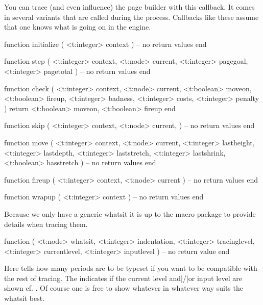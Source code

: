 You can trace (and even influence) the page builder with this callback. It comes in
several variants that are called during the process. Callbacks like these assume that
one knows what is going on in the engine.

\starttyping[option=LUA]
function initialize (
    <t:integer> context
)
    -- no return values
end
\stoptyping

\starttyping[option=LUA]
function step (
    <t:integer> context,
    <t:node>    current,
    <t:integer> pagegoal,
    <t:integer> pagetotal
)
    -- no return values
end
\stoptyping

\starttyping[option=LUA]
function check (
    <t:integer> context,
    <t:node>    current,
    <t:boolean> moveon,
    <t:boolean> fireup,
    <t:integer> badness,
    <t:integer> costs,
    <t:integer> penalty
)
    return <t:boolean> moveon, <t:boolean> fireup
end
\stoptyping

\starttyping[option=LUA]
function skip (
    <t:integer> context,
    <t:node>    current,
)
    -- no return values
end
\stoptyping

\starttyping[option=LUA]
function move (
    <t:integer> context,
        <t:node>    current,
        <t:integer> lastheight,
        <t:integer> lastdepth,
        <t:integer> laststretch,
        <t:integer> lastshrink,
        <t:boolean> hasstretch
)
    -- no return values
end
\stoptyping

\starttyping[option=LUA]
function fireup (
    <t:integer> context,
    <t:node> current
)
    -- no return values
end
\stoptyping

\starttyping[option=LUA]
function wrapup (
    <t:integer> context
)
    -- no return values
end
\stoptyping

\stopsubsection

\startsubsection[title=show_whatsit]

Because we only have a generic whatsit it is up to the macro package to provide
details when tracing them.

\starttyping[option=LUA]
function (
    <t:node>    whatsit,
    <t:integer> indentation,
    <t:integer> tracinglevel,
    <t:integer> currentlevel,
    <t:integer> inputlevel
)
    -- no return value
end
\stoptyping

Here  tells how many periods are to be typeset if you want to
be compatible with the rest of tracing. The  indicates if the
current level and|/|or input level are shown cf. \type {\tracinglevels}. Of
course one is free to show whatever in whatever way suits the whatsit best.

